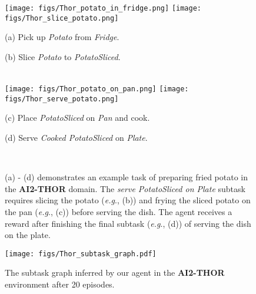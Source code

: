 \documentclass{article} \usepackage{iclr2020_conference,times}
\makeatletter
\DeclareRobustCommand\onedot{\futurelet\@let@token\@onedot}
\def\onedot{.}
\def\eg{\emph{e.g}\onedot} \def\Eg{\emph{E.g}\onedot}
\makeatother
\begin{document}
\begin{figure}[!htp]
    \centering
    \hfill
    \texttt{[image: figs/Thor\_potato\_in\_fridge.png]}
    \hfill
    \texttt{[image: figs/Thor\_slice\_potato.png]}
    \hfill
    \\[10pt]
    \hfill
    \begin{minipage}{0.45\linewidth}\centering
    (a) Pick up \emph{Potato} from \emph{Fridge}.      
    \end{minipage}
    \hfill
    \begin{minipage}{0.45\linewidth}\centering
    (b) Slice \emph{Potato} to \emph{PotatoSliced}.    
    \end{minipage}
    \hfill
    \\[15pt]
    \hfill
    \texttt{[image: figs/Thor\_potato\_on\_pan.png]}
    \hfill
    \texttt{[image: figs/Thor\_serve\_potato.png]}
    \hfill
    \\[10pt]
    \hfill
    \begin{minipage}{0.45\linewidth}\centering
    (c) Place \emph{PotatoSliced} on \emph{Pan} and cook.
    \end{minipage}
    \hfill
    \begin{minipage}{0.45\linewidth}\centering
    (d) Serve \emph{Cooked PotatoSliced} on \emph{Plate}.
    \end{minipage}
    \hfill
    \\[15pt]
    \caption{(a) - (d) demonstrates an example task of preparing fried potato in the \textbf{AI2-THOR} domain.
    The \textit{serve PotatoSliced on Plate} subtask requires slicing the potato (\eg, (b)) and frying the sliced potato on the pan (\eg, (c)) before serving the dish. The agent receives a reward after finishing the final subtask (\eg, (d)) of serving the dish on the plate.
    }
    \label{fig:thor_example}
    \vspace{-10pt}
\end{figure}

\begin{figure}[p]
    \centering
    \texttt{[image: figs/Thor\_subtask\_graph.pdf]}
    \vspace*{-9pt}
    \caption{
        The subtask graph inferred by our \NSGIGRProp agent in the \textbf{AI2-THOR} environment after 20 episodes.
    }
    \label{fig:thor_graph}
    \vspace{-13pt}
\end{figure}
\end{document}
